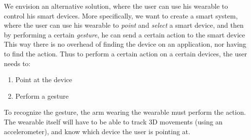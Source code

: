 We envision an alternative solution, 
where the user can use his wearable to control his smart devices. 
More specifically, we want to create a smart system, 
where the user can use his wearable to \emph{point} and \emph{select} a smart device, 
and then by performing a certain \emph{gesture}, he can send a certain action to the smart device
This way there is no overhead of finding the device on an application, 
nor having to find the action. 
Thus to perform a certain action on a certain devices, the user needs to:
\begin{enumerate}
  \item Point at the device
  \item Perform a gesture
\end{enumerate}

To recognize the gesture, the arm wearing the wearable must perform the action. 
The wearable itself will have to be able to track 3D movements (using \eg an accelerometer), 
and know which device the user is pointing at. 



%
